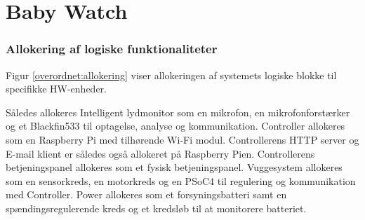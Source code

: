 \chapter{Baby Watch}




%
%




\subsection{Allokering af logiske funktionaliteter}
Figur \ref{overordnet:allokering} viser allokeringen af systemets logiske blokke til specifikke HW-enheder.

Således allokeres Intelligent lydmonitor som en mikrofon, en mikrofonforstærker og et Blackfin533 til optagelse, analyse og kommunikation.
Controller allokeres som en Raspberry Pi med tilhørende Wi-Fi modul. Controllerens HTTP server og E-mail klient er således også allokeret på Raspberry Pien. Controllerens betjeningspanel allokeres som et fysisk betjeningspanel.
Vuggesystem allokeres som en sensorkreds, en motorkreds og en PSoC4 til regulering og kommunikation med Controller.
Power allokeres som et forsyningsbatteri samt en spændingsregulerende kreds og et kredsløb til at monitorere batteriet.



